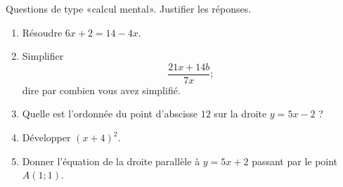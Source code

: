 
\begin{exercice}\label{exosmath-0699}

    Questions de type «calcul mental». Justifier les réponses.
    \begin{multicols}{2}
    \begin{enumerate}
        \item
            Résoudre $6x+2=14-4x$.
        \item
            Simplifier
            \begin{equation}
                \frac{ 21x+14b }{ 7x };
            \end{equation}
            dire par combien vous avez simplifié.
        \item
            Quelle est l'ordonnée du point d'abscisse \( 12\) sur la droite \( y=5x-2\) ?
        \item
            Développer \( (x+4)^2\).
        \item
            Donner l'équation de la droite parallèle à \( y=5x+2\) passant par le point \( A(1;1)\).
    \end{enumerate}
    \end{multicols}

\end{exercice}
